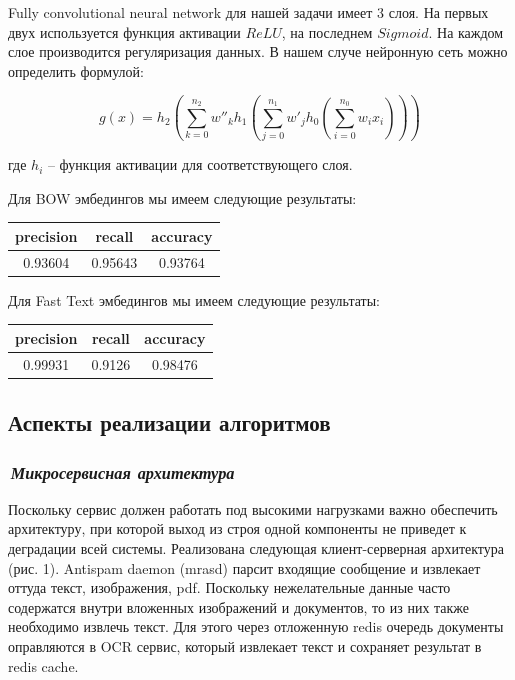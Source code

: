 \documentclass[12pt]{article}
\begin{document}
Fully convolutional neural network для нашей задачи имеет 3 слоя. На первых двух используется функция активации $ReLU$, на последнем $Sigmoid$. На каждом слое производится регуляризация данных. В нашем случе нейронную сеть можно определить формулой:

$$
g(x) = h_2 \left(\sum_{k=0}^{n_2} w''_k h_1\left(\sum_{j=0}^{n_1} w'_j h_0\left( \sum_{i=0}^{n_0} w_i x_i \right)\right)\right)
$$

где $h_i$ -- функция активации для соответствующего слоя.

Для BOW эмбедингов мы имеем следующие результаты:
\begin{center}
  \begin{tabular}{ | c | c | c |}
    \hline
     precision & recall & accuracy \\ \hline
     0.93604 & 0.95643 & 0.93764 \\ \hline
  \end{tabular}
\end{center}

Для Fast Text эмбедингов мы имеем следующие результаты:
\begin{center}
  \begin{tabular}{ | c | c | c |}
    \hline
     precision & recall & accuracy \\ \hline
     0.99931 & 0.9126 & 0.98476 \\ \hline
  \end{tabular}
\end{center}

\subsection{Аспекты реализации алгоритмов}

\subsubsection*{\it\,Микросервисная архитектура}

Поскольку сервис должен работать под высокими нагрузками важно обеспечить архитектуру, при которой выход из строя одной компоненты не приведет к деградации всей системы. Реализована следующая клиент-серверная архитектура (рис. 1). Antispam daemon (mrasd) парсит входящие сообщение и извлекает оттуда текст, изображения, pdf.  Поскольку нежелательные данные часто содержатся внутри вложенных изображений и документов, то из них также необходимо извлечь текст. Для этого через отложенную redis очередь документы оправляются в OCR сервис, который извлекает текст и сохраняет результат в redis cache.
\end{document}
